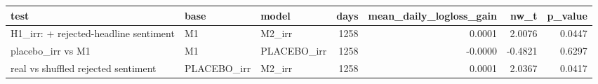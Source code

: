 \begin{tabular}{lllrrrr}
\toprule
test & base & model & days & mean\_daily\_logloss\_gain & nw\_t & p\_value \\
\midrule
H1\_irr: + rejected-headline sentiment & M1 & M2\_irr & 1258 & 0.0001 & 2.0076 & 0.0447 \\
placebo\_irr vs M1 & M1 & PLACEBO\_irr & 1258 & -0.0000 & -0.4821 & 0.6297 \\
real vs shuffled rejected sentiment & PLACEBO\_irr & M2\_irr & 1258 & 0.0001 & 2.0367 & 0.0417 \\
\bottomrule
\end{tabular}
